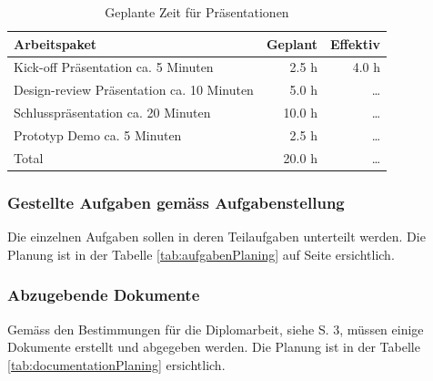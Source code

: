   \begin{table}[ht]
    \sffamily 
    \begin{center}
      \begin{tabular}{p{9cm}rr}
        \toprule
        \textbf{Arbeitspaket} & \textbf{Geplant} & \textbf{Effektiv} \\
        \midrule
        Kick-off Präsentation ca. 5 Minuten &
        2.5 h &
        4.0 h\\
        Design-review Präsentation ca. 10 Minuten &
        5.0 h &
        \ldots\\
        Schlusspräsentation ca. 20 Minuten &
        10.0 h &
        \ldots\\
        Prototyp Demo ca. 5 Minuten &
        2.5 h &
        \ldots\\
        \bottomrule
        Total &
        20.0 h &
        \ldots\\
        \bottomrule
      \end{tabular}
      \caption{Geplante Zeit für Präsentationen}
      \label{tab:presentationPlaning}
    \end{center}
  \end{table}
  
  \subsubsection{Gestellte Aufgaben gemäss Aufgabenstellung}
  
  Die einzelnen Aufgaben sollen in deren Teilaufgaben unterteilt werden. Die
  Planung ist in der Tabelle \ref{tab:aufgabenPlaning} auf Seite
  \pageref{tab:aufgabenPlaning} ersichtlich.
  
  \subsubsection{Abzugebende Dokumente}
  
  Gemäss den Bestimmungen für die Diplomarbeit, siehe \cite{hsz_reglement} S. 3,
  müssen einige Dokumente erstellt und abgegeben werden. Die Planung ist in der
  Tabelle \ref{tab:documentationPlaning} ersichtlich.
  \newline
  
